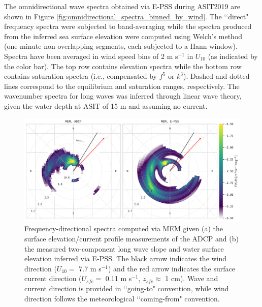 \documentclass[letterpaper,journal]{IEEEtran}
\begin{document}
\newpage

The omnidirectional wave spectra obtained via E-PSS during ASIT2019 are shown in Figure \ref{fig:omnidirectional_spectra_binned_by_wind}. The \lq\lq direct" frequency spectra were subjected to band-averaging while the spectra produced from the inferred sea surface elevation were computed using Welch's method (one-minute non-overlapping segments, each subjected to a Hann window). Spectra have been averaged in wind speed bins of 2 m s$^{-1}$ in $U_{10}$ (as indicated by the color bar). The top row contains elevation spectra while the bottom row contains saturation spectra (i.e., compensated by $f^5$ or $k^3$). Dashed and dotted lines correspond to the equilibrium and saturation ranges, respectively. The wavenumber spectra for long waves was inferred through linear wave theory, given the water depth at ASIT of 15 m and assuming no current.

\newpage

\begin{figure}[!ht]
    \centering
    \includegraphics[width=\textwidth]{_figures/directional_spectra_polar.pdf}
    \vspace{-20pt}
\caption{Frequency-directional spectra computed via MEM given (a) the surface elevation/current profile measurements of the ADCP and (b) the measured two-component long wave slope and water surface elevation inferred via E-PSS. The black arrow indicates the wind direction ($U_{10}=$ 7.7 m s$^{-1}$) and the red arrow indicates the surface current direction ($U_{sfc}=$ 0.11 m s$^{-1}$, $z_{sfc}\approx$ 1 cm). Wave and current direction is provided in \lq\lq going-to" convention, while wind direction follows the meteorological \lq\lq coming-from" convention.}
\label{fig:directional_spectra_polar}
\end{figure}
\end{document}
